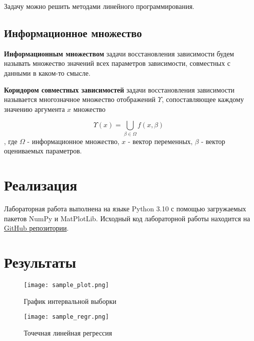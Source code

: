 \documentclass[12pt,a4paper]{article}
\begin{document}
                Задачу можно решить методами линейного программирования.
            
                \subsection{Информационное множество}
                \textbf{Информационным множеством} задачи восстановления зависимости
                будем называть множество значений всех параметров зависимости,
                совместных с данными в каком-то смысле. 
            
                \textbf{Коридором совместных зависимостей} задачи восстановления зависимости
                называется многозначное множество отображений $ \Upsilon $, сопоставляющее
                каждому значению аргумента $ x $ множество
                
                \begin{equation}
                    \Upsilon(x) = \bigcup_{\beta \in \Omega} f(x, \beta)
                \end{equation}
                , где $ \Omega $ - информационное множество, $ x $ - вектор переменных, $ \beta $ - вектор оцениваемых параметров. 
        
	\newpage
	
	\section{Реализация}
		Лабораторная работа выполнена на языке Python 3.10 с помощью загружаемых пакетов NumPy и MatPlotLib. Исходный код лабораторной работы находится на \href{https://github.com/Drusiand/SPbSTU_Interval_Analysis.git}{GitHub репозитории}.
	\newpage
	
	\section{Результаты}

        \begin{figure}[h!]
            \centering
            \texttt{[image: sample\_plot.png]}
            \caption{График интервальной выборки}
        \end{figure}

        \begin{figure}[h!]
            \centering
            \texttt{[image: sample\_regr.png]}
            \caption{Точечная линейная регрессия}
        \end{figure}
\end{document}
